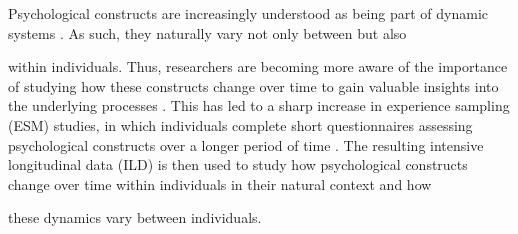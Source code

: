 
Psychological constructs are increasingly understood as being part of dynamic
systems \parencite{nesselroade_studying_2004, wang_investigating_2012,
    gelfand_dynamical_2012}. As such, they naturally vary not only between but also

within individuals. Thus, researchers are becoming more aware of the importance
of
studying how these constructs change over time to gain valuable insights into
the
underlying processes \parencite{molenaar_manifesto_2004}. This has led to a
sharp
increase in experience sampling (ESM) studies, in which
individuals complete short questionnaires assessing psychological constructs
over
a longer period of time \parencite{scollon_experience_2003,
    miller_smartphone_2012}. The resulting
intensive longitudinal data (ILD) is then used to study how psychological
constructs change over time within individuals in their natural context and how

these dynamics vary between individuals.

